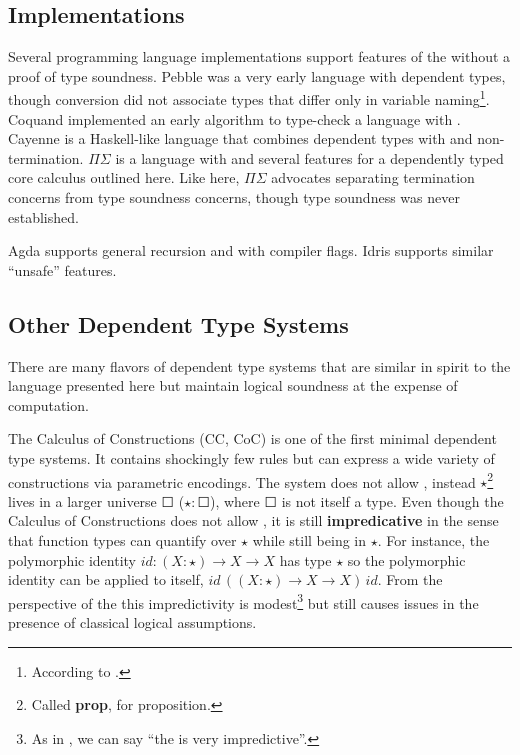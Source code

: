 \subsection{Implementations}
 
Several programming language implementations support features of the \slang{} without a proof of type soundness.
Pebble\cite{10.1007/3-540-13346-1_1} was a very early language with dependent types, though conversion did not associate types that differ only in variable naming\footnote{
  According to \cite{Reinhold89typecheckingis}.
}.
Coquand implemented an early \bidir{} algorithm to type-check a language with \tit{}\cite{COQUAND1996167}.
Cayenne\cite{10.1145/289423.289451} is a Haskell-like language that combines dependent types with \tit{} and non-termination.
$\Pi\Sigma$\cite{10.1007/978-3-642-12251-4_5} is a language with \tit{} and several features for a dependently typed core calculus outlined here.
Like here, $\Pi$$\Sigma$ advocates separating termination concerns from type soundness concerns, though type soundness was never established.
 
Agda supports general recursion and \tit{} with compiler flags.
Idris supports similar ``unsafe'' features.
 
\subsection{Other Dependent Type Systems}
 
There are many flavors of dependent type systems that are similar in spirit to the language presented here but maintain logical soundness at the expense of computation.
 
The Calculus of Constructions (\ac{CC}, CoC)\cite{10.1016/0890-5401(88)90005-3} is one of the first minimal dependent type systems.
It contains shockingly few rules but can express a wide variety of constructions via parametric encodings.
The system does not allow \tit{}, instead $\star$\footnote{
  Called \textbf{prop}, for proposition.
} lives in a larger universe  $\Square$ ($\star:\Square$), where $\Square$ is not itself a type.
Even though the Calculus of Constructions does not allow \tit{}, it is still \textbf{impredicative} in the sense that function types can quantify over $\star$ while still being in $\star$.
For instance, the polymorphic identity $id:(X:\star)\rightarrow X\rightarrow X$ has type $\star$ so the polymorphic identity can be applied to itself, $id\,\left((X:\star)\rightarrow X\rightarrow X\right)\,id$.
From the perspective of the \slang{} this impredictivity is modest\footnote{
  As in \cite{10.1007/978-3-642-12251-4_5}, we can say ``the \slang{} is very impredictive''. 
} but still causes issues in the presence of classical logical assumptions. 
 
